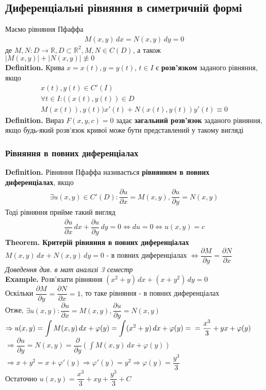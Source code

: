 \documentclass[a4paper, 14pt]{extarticle}
\def\huge{\displaystyle}
\def\bigline{\vspace{5mm}\\}
\begin{document}
\subsection{Диференціальні рівняння в симетричній формі}
Маємо рівняння Пфаффа
\begin{align*}
M(x,y)\,dx = N(x,y)\,dy = 0
\end{align*}
де $M,N: D \to \mathbb{R}, D \subset \mathbb{R}^2, M,N \in C(D)$, а також\\
$|M(x,y)|+|N(x,y)| \not\equiv 0$
\bigline
\textbf{Definition.} Крива $x=x(t), y=y(t)$, $t \in I$ є \textbf{розв'язком} заданого рівняння, якщо
\begin{align*}
x(t),y(t) \in C'(I) \\
\forall t \in I: ((x(t),y(t)) \in D \\
M(x(t)),y(t))x'(t) + N(x(t),y(t))y'(t) \equiv 0
\end{align*}
\textbf{Definition.} Вираз $F(x,y,c) = 0$ задає \textbf{загальний розв'язок} заданого рівняння, якщо будь-який розв'язок кривої може бути представлений у такому вигляді
\bigline

\subsubsection{Рівняння в повних диференціалах}
\textbf{Definition.} Рівняння Пфаффа називається \textbf{рівнянням в повних \\ диференціалах}, якщо
\begin{align*}
\exists u(x,y) \in C'(D): \dfrac{\partial u}{\partial x} = M(x,y), \dfrac{\partial u}{\partial y} = N(x,y)
\end{align*}
Тоді рівняння прийме такий вигляд
\begin{align*}
\dfrac{\partial u}{\partial x}\,dx + \dfrac{\partial u}{\partial y}\,dy = 0 \iff du = 0 \iff u(x,y)=c
\end{align*}
\textbf{Theorem. Критерій рівняння в повних диференціалах}\\
$M(x,y)\,dx + N(x,y)\,dy = 0$ - в повних диференціалах $\iff \dfrac{\partial M}{\partial y} = \dfrac{\partial N}{\partial x}$\\
\textit{Доведення див. в мат анализі 3 семестр}
\bigline
\textbf{Example.} Розв'язати рівняння $(x^2+y)\,dx + (x+y^2)\,dy = 0$\\
Оскільки $\dfrac{\partial M}{\partial y} = \dfrac{\partial N}{\partial x} = 1$, то таке рівняння - в повних диференціалах\\
Отже, $\exists u(x,y): \dfrac{\partial u}{\partial x} = M(x,y), \dfrac{\partial u}{\partial y} = N(x,y)$\\
$\Rightarrow u(x,y) = \huge \int M(x,y)\,dx + \varphi(y) = \int (x^2+y)\,dx + \varphi(y) = \\ = \dfrac{x^3}{3} + yx + \varphi(y)$\\
$\Rightarrow \dfrac{\partial u}{\partial y} = N(x,y) = \dfrac{\partial}{\partial y} \left( \huge \int M(x,y)\,dx + \varphi(y) \right)$\\
$\Rightarrow x + y^2 = x + \varphi'(y) \Rightarrow \varphi'(y) = y^2 \Rightarrow \varphi(y) = \dfrac{y^3}{3}$\\
Остаточно $u(x,y) = \dfrac{x^3}{3} + xy + \dfrac{y^3}{3} + C$
\bigline
\end{document}
